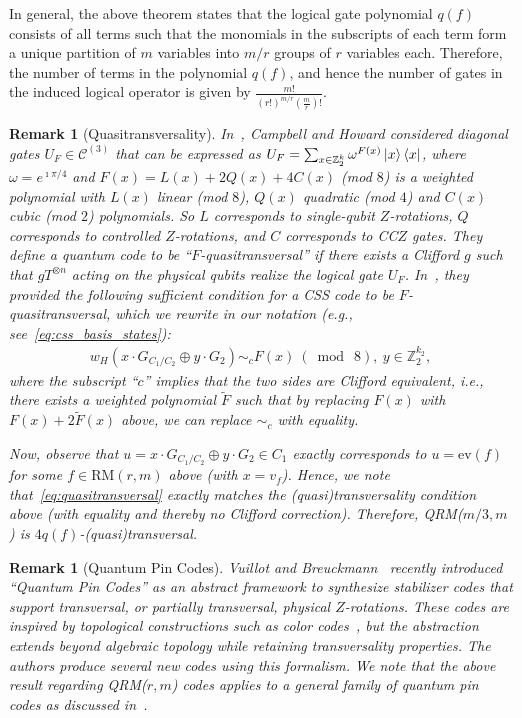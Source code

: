 \documentclass[twoside,romanappendices]{IEEEtran}
\newtheorem{remark}[theorem]{Remark}
\begin{document}
In general, the above theorem states that the logical gate polynomial $q(f)$ consists of all terms such that the monomials in the subscripts of each term form a unique partition of $m$ variables into $m/r$ groups of $r$ variables each.
Therefore, the number of terms in the polynomial $q(f)$, and hence the number of gates in the induced logical operator is given by $\frac{m!}{(r!)^{m/r} \left( \frac{m}{r} \right)!}$.



\begin{remark}[Quasitransversality]
\normalfont
In~\cite{Campbell-pra17,Campbell-prl17}, Campbell and Howard considered diagonal gates $U_F \in \mathcal{C}^{(3)}$ that can be expressed as $U_F = \sum_{x \in \mathbb{Z}_2^k} \omega^{F(x)} \ketbra{x}$, where $\omega = e^{\imath\pi/4}$ and $F(x) = L(x) + 2Q(x) + 4C(x)$ (mod $8$) is a weighted polynomial with $L(x)$ linear (mod $8$), $Q(x)$ quadratic (mod $4$) and $C(x)$ cubic (mod $2$) polynomials.
So $L$ corresponds to single-qubit $Z$-rotations, $Q$ corresponds to controlled $Z$-rotations, and $C$ corresponds to CC$Z$ gates.
They define a quantum code to be ``$F$-quasitransversal'' if there exists a Clifford $g$ such that $g T^{\otimes n}$ acting on the physical qubits realize the logical gate $U_F$.
In~\cite[Lemma 1]{Campbell-pra17}, they provided the following sufficient condition for a CSS code to be $F$-quasitransversal, which we rewrite in our notation (e.g., see~\eqref{eq:css_basis_states}):
\begin{align}
    w_H(x \cdot G_{C_1/C_2} \oplus y \cdot G_2) \sim_{c} F(x) \ (\bmod\ 8), \ y \in \mathbb{Z}_2^{k_2},
\end{align}
where the subscript ``$c$'' implies that the two sides are Clifford equivalent, i.e., there exists a weighted polynomial $\tilde{F}$ such that by replacing $F(x)$ with $F(x) + 2\tilde{F}(x)$ above, we can replace $\sim_{c}$ with equality.

Now, observe that $u = x \cdot G_{C_1/C_2} \oplus y \cdot G_2 \in C_1$ exactly corresponds to $u = \text{ev}(f)$ for some $f \in \text{RM}(r,m)$ above (with $x = v_f$).
Hence, we note that~\eqref{eq:quasitransversal} exactly matches the (quasi)transversality condition above (with equality and thereby no Clifford correction).
Therefore, QRM($m/3,m$) is $4 q(f)$-(quasi)transversal.
\end{remark}


\begin{remark}[Quantum Pin Codes]
\normalfont
Vuillot and Breuckmann~\cite{Vuillot-arxiv19} recently introduced ``Quantum Pin Codes'' as an abstract framework to synthesize stabilizer codes that support transversal, or partially transversal, physical $Z$-rotations.
These codes are inspired by topological constructions such as color codes~\cite{Kubica-pra15}, but the abstraction extends beyond algebraic topology while retaining transversality properties.
The authors produce several new codes using this formalism.
We note that the above result regarding QRM($r,m$) codes applies to a general family of quantum pin codes as discussed in~\cite[Section V-D]{Vuillot-arxiv19}.
\end{remark}
\end{document}
